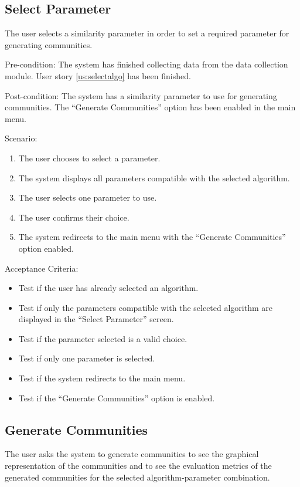 \subsection{Select Parameter}
\label{us:selectparam}

The user selects a similarity parameter in order to set a required parameter for generating communities.

Pre-condition: The system has finished collecting data from the data collection module. User story \ref{us:selectalgo} has been finished.

Post-condition: The system has a similarity parameter to use for generating communities. The ``Generate Communities'' option
has been enabled in the main menu.

Scenario:
\begin{enumerate}
	\item The user chooses to select a parameter.
	\item The system displays all parameters compatible with the selected algorithm.
	\item The user selects one parameter to use.
	\item The user confirms their choice.
	\item The system redirects to the main menu with the ``Generate Communities'' option enabled.
\end{enumerate}

Acceptance Criteria:
\begin{itemize}
	\item Test if the user has already selected an algorithm.
	\item Test if only the parameters compatible with the selected algorithm are displayed in the ``Select Parameter'' screen.
	\item Test if the parameter selected is a valid choice.
	\item Test if only one parameter is selected.
	\item Test if the system redirects to the main menu.
	\item Test if the ``Generate Communities'' option is enabled.
\end{itemize}

\subsection{Generate Communities}
\label{us:gencom}

The user asks the system to generate communities to see the graphical representation of the communities and to see the 
evaluation metrics of the generated communities for the selected algorithm-parameter combination.

